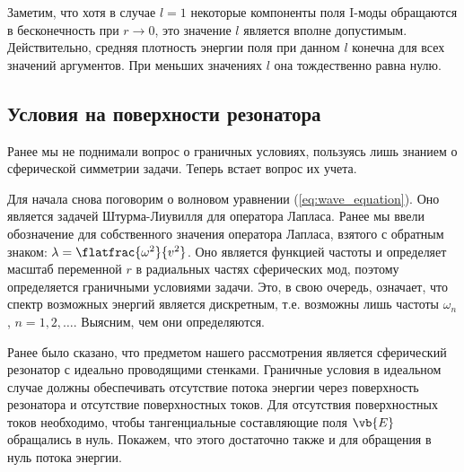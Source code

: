     Заметим, что хотя в случае $l = 1$ некоторые компоненты поля $\mathrm{I}$-моды обращаются в бесконечность при $r \to 0$, это значение $l$ является вполне допустимым. Действительно, средняя плотность энергии поля\footnotemark{} при данном $l$ конечна для всех значений аргументов. При меньших значениях $l$ она тождественно равна нулю.


%
%
%
%
%
%

\subsection{Условия на поверхности резонатора}

    Ранее мы не поднимали вопрос о граничных условиях, пользуясь лишь знанием о сферической симметрии задачи. Теперь встает вопрос их учета.

    Для начала снова поговорим о волновом уравнении (\autoref{eq:wave_equation}). Оно является задачей Штурма-Лиувилля для оператора Лапласа. Ранее мы ввели обозначение для собственного значения оператора Лапласа, взятого с обратным знаком: $\lambda = \flatfrac{\omega^2}{v^2}$. Оно является функцией частоты и определяет масштаб переменной $r$ в радиальных частях сферических мод, поэтому определяется граничными условиями задачи. Это, в свою очередь, означает, что спектр возможных энергий является дискретным, т.е. возможны лишь частоты $\omega_n$, $n = 1, 2, \dots$. Выясним, чем они определяются.

    Ранее было сказано, что предметом нашего рассмотрения является сферический резонатор с идеально проводящими стенками. Граничные условия в идеальном случае должны обеспечивать отсутствие потока энергии через поверхность резонатора и отсутствие поверхностных токов. Для отсутствия поверхностных токов необходимо, чтобы тангенциальные составляющие поля $\vb{E}$ обращались в нуль. Покажем, что этого достаточно также и для обращения в нуль потока энергии.

